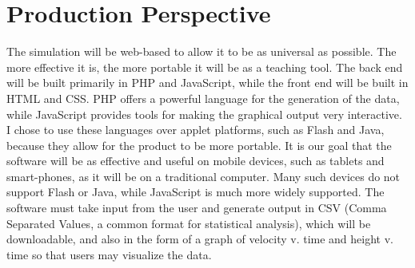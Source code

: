 \documentclass{report}
\begin{document}
	\section{Production Perspective}
		The simulation will be web-based to allow it to be as universal as possible.  The more effective it is, the more portable it will be as a teaching tool.  The back end will be built primarily in PHP and JavaScript, while the front end will be built in HTML and CSS.  PHP offers a powerful language for the generation of the data, while JavaScript provides tools for making the graphical output very interactive.  I chose to use these languages over applet platforms, such as Flash and Java, because they allow for the product to be more portable.  It is our goal that the software will be as effective and useful on mobile devices, such as tablets and smart-phones, as it will be on a traditional computer.  Many such devices do not support Flash or Java, while JavaScript is much more widely supported.
		The software must take input from the user and generate output in CSV (Comma Separated Values, a common format for statistical analysis), which will be downloadable, and also in the form of a graph of velocity v. time and height v. time so that users may visualize the data.
\end{document}
